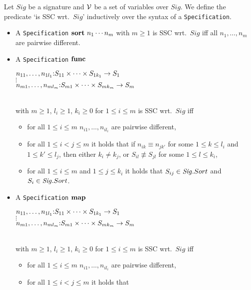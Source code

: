 \documentclass[twoside,fleqn,a4paper,dvips]{article}
\newcommand{\Sig}{\nm{Sig}}
\newcommand{\NV}{{\cal V}}
\begin{document}
\begin{defn}[\tt Specification]
Let $Sig$ be a signature and $\NV$ be a set of variables over $Sig$. We
define the predicate `is SSC wrt.\ $Sig$'
inductively over the syntax of a {\tt Specification}.
\begin{itemize}
\item
A {\tt Specification}
$\mathbf{sort}~n_1\cdots n_m$ with $m\geq 1$
is SSC wrt.\ $Sig$ iff all $n_1,\ldots,n_m$ are pairwise
different.
\item
A {\tt Specification}
$\mathbf{func}$
\begin{minipage}[t]{7cm}
$n_{11},\ldots,n_{1l_1}{:} S_{11}\times \cdots\times S_{1k_1}\rightarrow
S_1$\\
$\vdots$\\
$n_{m1},\ldots,n_{ml_m}{:} S_{m1}\times \cdots\times S_{mk_m}\rightarrow
S_m$\vspace{2ex}
\end{minipage}\\
with $m\geq 1$, $l_i\geq 1$, $k_i\geq 0$ for $1\leq i\leq m$
is SSC wrt.\ $Sig$ iff 
\begin{itemize}
\item
for all $1\leq i\leq m$  $n_{i1},\ldots,n_{il_i}$ are
pairwise different,
\item
for all $1\leq i<j\leq m$ it holds that
if $n_{ik}\equiv n_{jk'}$ for some $1\leq k\leq l_i$ and $1\leq
k'\leq l_j$, then either $k_i\neq k_j$, or $S_{il}\not\equiv
S_{jl}$ for some $1\leq l\leq k_i$,
\item
for all $1\leq i\leq m$ and $1\leq j\leq k_i$ it holds that
$S_{ij}\in \Sig.Sort$ and $S_i\in \Sig.Sort$.
\end{itemize}
\item
A {\tt Specification}
$\mathbf{map}$
\begin{minipage}[t]{7cm}
$n_{11},\ldots,n_{1l_1}{:} S_{11}\times \cdots\times S_{1k_1}\rightarrow
S_1$\\
$\vdots$\\
$n_{m1},\ldots,n_{ml_m}{:} S_{m1}\times \cdots\times S_{mk_m}\rightarrow
S_m$\vspace{2ex}
\end{minipage}\\
with $m\geq 1$, $l_i\geq 1$, $k_i\geq 0$ for $1\leq i\leq m$
is SSC wrt.\ $Sig$ iff 
\begin{itemize}
\item
for all $1\leq i\leq m$  $n_{i1},\ldots,n_{il_i}$ are
pairwise different,
\item
for all $1\leq i<j\leq m$ it holds that

\end{itemize}
\end{itemize}
\end{defn}
\end{document}

